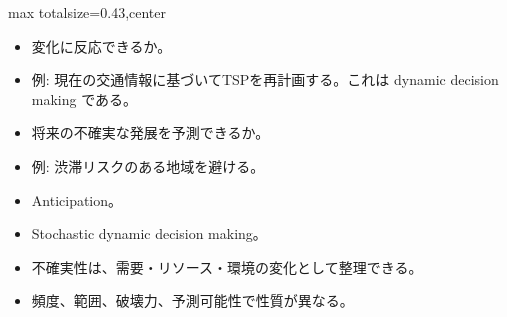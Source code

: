 \clearpage
{}
\begin{minipage}[t]{0.405\textwidth}
\begin{adjustbox}{max totalsize={\textwidth}{0.43\textheight},center}
\begin{minipage}{\textwidth}\scriptsize
{}\begin{itemize}
\item 変化に反応できるか。
\item 例: 現在の交通情報に基づいてTSPを再計画する。これは dynamic decision making である。
\item 将来の不確実な発展を予測できるか。
\item 例: 渋滞リスクのある地域を避ける。
\item Anticipation。
\item Stochastic dynamic decision making。
\end{itemize}\begin{itemize}
\item 不確実性は、需要・リソース・環境の変化として整理できる。
\item 頻度、範囲、破壊力、予測可能性で性質が異なる。
\end{itemize}
\end{minipage}
\end{adjustbox}
\end{minipage}\hfill

